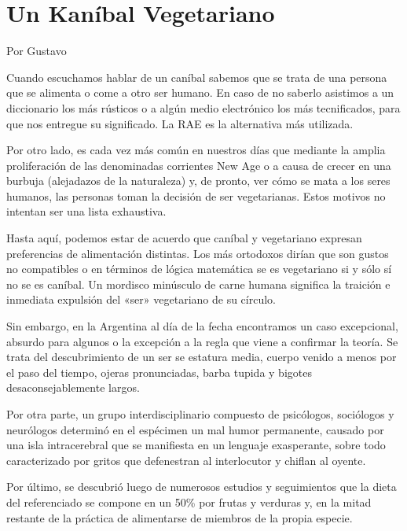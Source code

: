 \documentclass[11pt,twoside,openright,a5paper]{book}
\begin{document}
\section*{Un Kaníbal Vegetariano}

\begin{flushright}Por Gustavo\end{flushright}

Cuando escuchamos hablar de un caníbal sabemos que se trata de una persona que se alimenta o come a otro ser humano. En caso de no saberlo asistimos a un diccionario los más rústicos o a algún medio electrónico los más tecnificados, para que nos entregue su significado. La RAE es la alternativa más utilizada.

Por otro lado, es cada vez más común en nuestros días que mediante la amplia proliferación de las denominadas corrientes New Age o a causa de crecer  en una burbuja (alejadazos de la naturaleza) y, de pronto, ver cómo se mata a los seres humanos, las personas toman la decisión de ser vegetarianas. Estos motivos no intentan ser una lista exhaustiva.

Hasta aquí, podemos estar de acuerdo que caníbal y vegetariano expresan preferencias de alimentación distintas. Los más ortodoxos dirían que son gustos no compatibles o en términos de lógica matemática se es vegetariano si y sólo sí no se es caníbal. Un mordisco minúsculo de carne humana significa la traición e inmediata expulsión del «ser» vegetariano de su círculo.

Sin embargo, en la Argentina al día de la fecha encontramos un caso excepcional, absurdo para algunos o la excepción a la regla que viene a confirmar la teoría. Se trata del descubrimiento de un ser se estatura media, cuerpo venido a menos por el paso del tiempo, ojeras pronunciadas, barba tupida y bigotes desaconsejablemente largos.

Por otra parte, un grupo interdisciplinario compuesto de psicólogos, sociólogos y neurólogos determinó en el espécimen un mal humor permanente, causado por una isla intracerebral que se manifiesta en un lenguaje exasperante, sobre todo caracterizado por gritos que defenestran al interlocutor y chiflan al oyente. 

Por último, se descubrió luego de numerosos estudios y seguimientos que la dieta del referenciado se compone en un 50\% por frutas y verduras y, en la mitad restante de la práctica de alimentarse de miembros de la propia especie.
\end{document}
